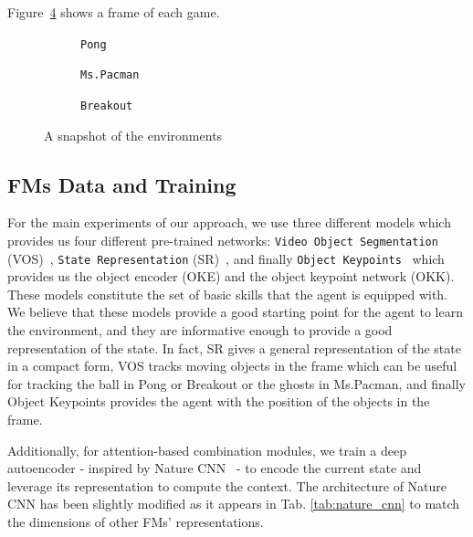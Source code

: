 Figure~\ref{fig:environemnts} shows a frame of each game.
\begin{figure}[ht]
    \centering
    \begin{subfigure}[b]{0.30\textwidth}
        \centering
        \fbox{\rule[-.5cm]{0cm}{4cm} \rule[-.5cm]{4cm}{0cm}}
        \caption{\texttt{Pong}}
        \label{fig:pong_env}
    \end{subfigure}
    \hfill
    \begin{subfigure}[b]{0.30\textwidth}
        \centering
        \fbox{\rule[-.5cm]{0cm}{4cm} \rule[-.5cm]{4cm}{0cm}}
        \caption{\texttt{Ms.Pacman}}
        \label{fig:mspacman_env}
    \end{subfigure}
    \hfill
    \begin{subfigure}[b]{0.30\textwidth}
        \centering
        \fbox{\rule[-.5cm]{0cm}{4cm} \rule[-.5cm]{4cm}{0cm}}
        \caption{\texttt{Breakout}}
        \label{fig:breakout_env}
    \end{subfigure}
    \caption{A snapshot of the environments}
    \label{fig:environemnts}
\end{figure}


\subsection{FMs Data and Training}\label{subsec:fms-data-and-training}
For the main experiments of our approach, we use three different models which provides us four different pre-trained networks: \texttt{Video Object Segmentation} (VOS)~\citep{goel2018unsupervised}, \texttt{State Representation} (SR)~\citep{anand2019unsupervised}, and finally \texttt{Object Keypoints}~\citep{kulkarni2019unsupervised} which provides us the object encoder (OKE) and the object keypoint network (OKK).
These models constitute the set of basic skills that the agent is equipped with.
We believe that these models provide a good starting point for the agent to learn the environment, and they are informative enough to provide a good representation of the state.
In fact, SR gives a general representation of the state in a compact form, VOS tracks moving objects in the frame which can be useful for tracking the ball in Pong or Breakout or the ghosts in Ms.Pacman, and finally Object Keypoints provides the agent with the position of the objects in the frame.

Additionally, for attention-based combination modules, we train a deep autoencoder - inspired by Nature CNN~\citep{mnih2015human} - to encode the current state and leverage its representation to compute the context.
The architecture of Nature CNN has been slightly modified as it appears in Tab. \ref{tab:nature_cnn} to
match the dimensions of other FMs' representations.

